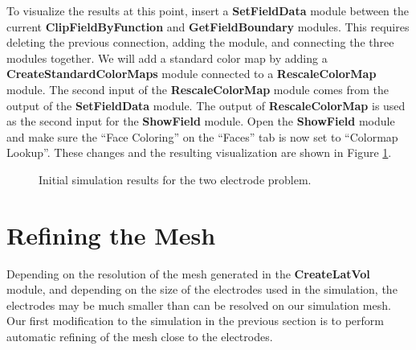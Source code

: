 \documentclass[fleqn,11pt,openany]{book}
\begin{document}
To visualize the results at this point, insert a {\bf SetFieldData}
module between the current {\bf ClipFieldByFunction} and {\bf
GetFieldBoundary} modules. This requires deleting the previous
connection, adding the module, and connecting the three modules
together. We will add a standard color map by adding a {\bf
CreateStandardColorMaps} module connected to a {\bf RescaleColorMap}
module. The second input of the {\bf RescaleColorMap} module comes
from the output of the {\bf SetFieldData} module. The output of {\bf
RescaleColorMap} is used as the second input for the {\bf ShowField}
module. Open the {\bf ShowField} module and make sure the ``Face
Coloring'' on the ``Faces'' tab is now set to ``Colormap
Lookup''. These changes and the resulting visualization are shown in
Figure \ref{fig:defib_fem_nw_r_08}.

\begin{figure}
\caption{Initial simulation results for the two electrode
problem.}\label{fig:defib_fem_nw_r_08}
\end{figure}

\section{Refining the Mesh}

Depending on the resolution of the mesh generated in the {\bf
CreateLatVol} module, and depending on the size of the electrodes used
in the simulation, the electrodes may be much smaller than can be
resolved on our simulation mesh. Our first modification to the
simulation in the previous section is to perform automatic refining of
the mesh close to the electrodes.
\end{document}
